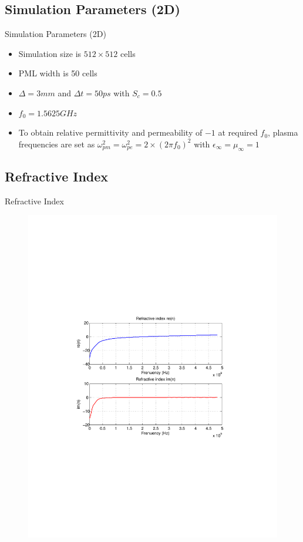 \documentclass{beamer}
\begin{document}
\subsection{Simulation Parameters (2D)}
\begin{frame}{Simulation Parameters (2D)}
	\begin{itemize}
	\item Simulation size is $512\times 512$ cells
	\item PML width is 50 cells
	\item $\Delta = 3 mm$ and $\Delta t = 50 ps$ with $S_c=0.5$
	\item $f_0=1.5625 GHz$
	\item  To obtain relative permittivity and permeability of $-1$ at required $f_0$, plasma frequencies are set as $\omega^2_{pm}=\omega^2_{pe}=2\times(2\pi f_0)^2$ with $\epsilon_\infty=\mu_\infty=1$
	\end{itemize}
\end{frame}
\subsection{Refractive Index}
\begin{frame}{Refractive Index}
\begin{figure}[H]
\centering
\includegraphics[scale=0.5, trim=3.5cm 8.7cm 4.5cm 8.85cm, clip]{Figures/FigCh03_2DDNGRefractiveIndex.pdf}
\label{fig:2DDNG-Refractive-Index}
\end{figure}
\end{frame}
\end{document}
